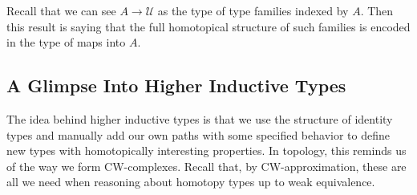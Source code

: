 \documentclass{article}
\begin{document}
Recall that we can see $A\to \mathcal{U}$ as the type of type families indexed by $A$. Then this result is saying that the full homotopical structure of such families is encoded in the type of maps into $A$.

\subsection*{A Glimpse Into Higher Inductive Types}
The idea behind higher inductive types is that we use the structure of identity types and manually add our own paths with some specified behavior to define new types with homotopically interesting properties. In topology, this reminds us of the way we form CW-complexes. Recall that, by CW-approximation, these are all we need when reasoning about homotopy types up to weak equivalence.

\begin{thebibliography}{}
\end{thebibliography}
\end{document}
